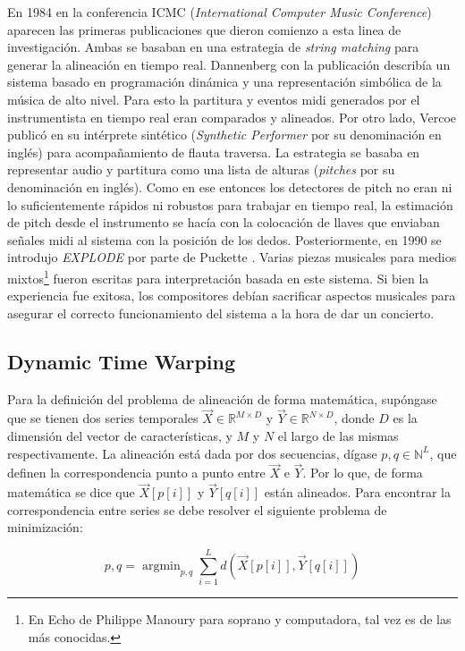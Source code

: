 \documentclass
  [ams,pdfout]%
	{aeslac}
\DeclareMathOperator*{\argmin}{argmin}
\begin{document}
En 1984 en la conferencia ICMC (\textit{International Computer Music Conference}) aparecen las primeras publicaciones que dieron comienzo a esta linea de investigación. Ambas se basaban en una estrategia de \textit{string matching} para generar la alineación en tiempo real. Dannenberg con la publicación \cite{dannenberg1984line} describía un sistema basado en programación dinámica y una representación simbólica de la música de alto nivel. Para esto la partitura y eventos midi generados por el instrumentista en tiempo real eran comparados y alineados. Por otro lado, Vercoe publicó en \cite{vercoe1984synthetic} su intérprete sintético (\textit{Synthetic Performer} por su denominación en inglés) para acompañamiento de flauta traversa. La estrategia se basaba en representar audio y partitura como una lista de alturas (\textit{pitches} por su denominación en inglés). Como en ese entonces los detectores de pitch no eran ni lo suficientemente rápidos ni robustos para trabajar en tiempo real, la estimación de pitch desde el instrumento se hacía con la colocación de llaves que enviaban señales midi al sistema con la posición de los dedos. Posteriormente, en 1990 se introdujo \textit{EXPLODE} por parte de Puckette \cite{puckette1990explode}. Varias piezas musicales para medios mixtos\footnote{En Echo de Philippe Manoury para soprano y computadora, tal vez es de las más conocidas.} fueron escritas para interpretación basada en este sistema. Si bien la experiencia fue exitosa, los compositores debían sacrificar aspectos musicales para asegurar el correcto funcionamiento del sistema a la hora de dar un concierto. 

\subsection{Dynamic Time Warping}

Para la definición del problema de alineación de forma matemática, supóngase que se tienen dos series temporales $\vec{X}\in\mathbb{R}^{M\times D}$ y $\vec{Y}\in\mathbb{R}^{N\times D}$, donde $D$ es la dimensión del vector de características, y $M$ y $N$ el largo de las mismas respectivamente. La alineación está dada por dos secuencias, dígase $p, q \in \mathbb{N}^{L}$, que definen la correspondencia punto a punto entre $\vec{X}$ e $\vec{Y}$. Por lo que, de forma matemática se dice que $\vec{X}[p[i]]$ y $\vec{Y}[q[i]]$ están alineados. Para encontrar la correspondencia entre series se debe resolver el siguiente problema de minimización:

\begin{equation}
p,q = \argmin_{p,q} \sum_{i=1}^{L} d(\vec{X}[p[i]],\vec{Y}[q[i]]) 
\end{equation}
\end{document}
